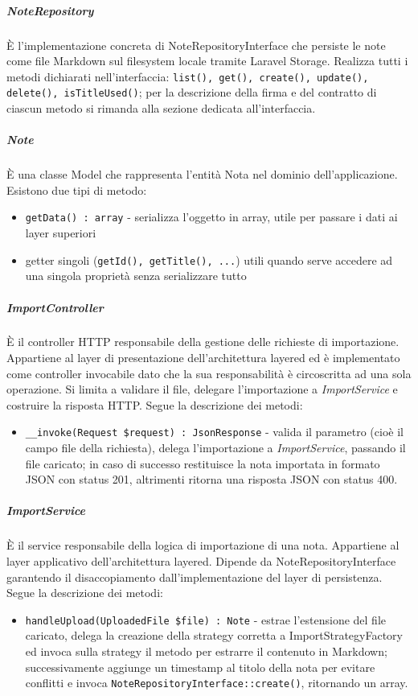 \documentclass[a4paper,10pt]{article}
\begin{document}
\subparagraph{NoteRepository} È l'implementazione concreta di NoteRepositoryInterface che persiste le note come file Markdown sul filesystem locale tramite Laravel Storage. Realizza tutti i metodi dichiarati nell'interfaccia: \texttt{list(), get(), create(), update(), delete(), isTitleUsed()}; per la descrizione della firma e del contratto di ciascun metodo si rimanda alla sezione dedicata all'interfaccia.
\subparagraph{Note} È una classe Model che rappresenta l'entità Nota nel dominio dell'applicazione. Esistono due tipi di metodo:
\begin{itemize}
    \item \texttt{getData() : array} - serializza l'oggetto in array, utile per passare i dati ai layer superiori
    \item getter singoli (\texttt{getId(), getTitle(), ...}) utili quando serve accedere ad una singola proprietà senza serializzare tutto
\end{itemize}
\subparagraph{ImportController} È il controller HTTP responsabile della gestione delle richieste di importazione. Appartiene al layer di presentazione dell'architettura layered ed è implementato come controller invocabile dato che la sua responsabilità è circoscritta ad una sola operazione. Si limita a validare il file, delegare l'importazione a \textit{ImportService} e costruire la risposta HTTP. Segue la descrizione dei metodi:
\begin{itemize}
    \item \texttt{\_\_invoke(Request \$request) : JsonResponse} - valida il parametro (cioè il campo file della richiesta), delega l'importazione a \textit{ImportService}, passando il file caricato; in caso di successo restituisce la nota importata in formato JSON con status 201, altrimenti ritorna una risposta JSON con status 400.
\end{itemize}
\subparagraph{ImportService} È il service responsabile della logica di importazione di una nota. Appartiene al layer applicativo dell'architettura layered. Dipende da NoteRepositoryInterface garantendo il disaccopiamento dall'implementazione del layer di persistenza. Segue la descrizione dei metodi:
\begin{itemize}
    \item \texttt{handleUpload(UploadedFile \$file) : Note} - estrae l'estensione del file caricato, delega la creazione della strategy corretta a ImportStrategyFactory ed invoca sulla strategy il metodo per estrarre il contenuto in Markdown; successivamente aggiunge un timestamp al titolo della nota per evitare conflitti e invoca \texttt{NoteRepositoryInterface::create()}, ritornando un array.
\end{itemize}
\end{document}
